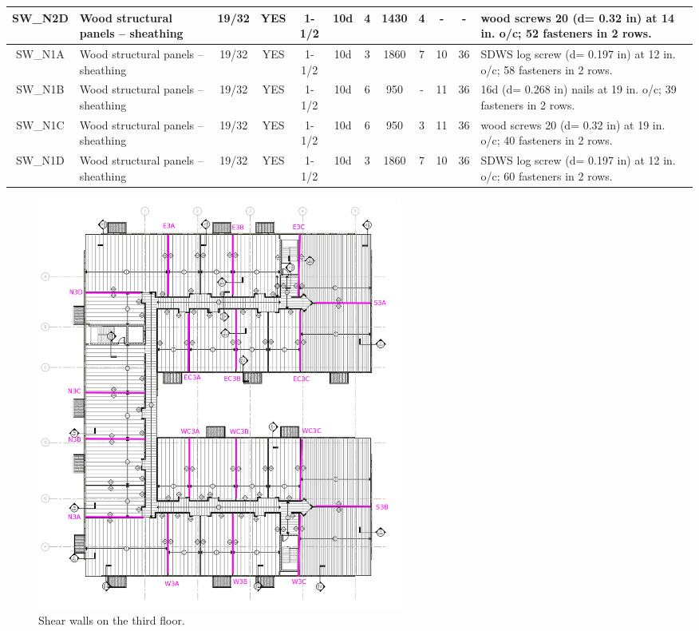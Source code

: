 \begin{center}
\begin{tiny}
\begin{longtable}{|c|p{1.5cm}|c|c|c|c|c|c|c|c|c|p{3cm}|}
\hline
SW\_N2D & Wood structural panels – sheathing & 19/32 & YES & 1-1/2 & 10d & 4 & 1430 & 4 & - & - & wood screws 20 (d= 0.32 in) at 14 in. o/c; 52 fasteners in 2 rows.\\
\hline
SW\_N1A & Wood structural panels – sheathing & 19/32 & YES & 1-1/2 & 10d & 3 & 1860 & 7 & 10 & 36 & SDWS log screw (d= 0.197 in) at 12 in. o/c; 58 fasteners in 2 rows.\\
\hline
SW\_N1B & Wood structural panels – sheathing & 19/32 & YES & 1-1/2 & 10d & 6 & 950 & - & 11 & 36 & 16d (d= 0.268 in) nails at 19 in. o/c; 39 fasteners in 2 rows.\\
\hline
SW\_N1C & Wood structural panels – sheathing & 19/32 & YES & 1-1/2 & 10d & 6 & 950 & 3 & 11 & 36 & wood screws 20 (d= 0.32 in) at 19 in. o/c; 40 fasteners in 2 rows.\\
\hline
SW\_N1D & Wood structural panels – sheathing & 19/32 & YES & 1-1/2 & 10d & 3 & 1860 & 7 & 10 & 36 & SDWS log screw (d= 0.197 in) at 12 in. o/c; 60 fasteners in 2 rows.\\
\hline
  \end{longtable}
  \end{tiny}
  \end{center}

\begin{figure}
  \begin{center}
  \includegraphics[width=120mm]{figures/3rd_floor_key_plan}
  \end{center}
  \caption{Shear walls on the third floor.}\label{fg_3rd_floor_key_plan}
\end{figure}

